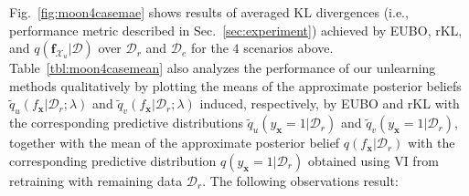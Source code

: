 \documentclass{article}
\theoremstyle{definition}
\newcommand{\mbf}[1]{\mathbf{#1}}
\newcommand{\mcl}[1]{\mathcal{#1}}
\newcommand{\da}{\mcl{D}}
\newcommand{\dc}{\mcl{D}_r}
\newcommand{\dr}{\mcl{D}_e}
\newcommand{\eubo}{\tilde{q}_u}
\newcommand{\elbo}{\tilde{q}_v}
\begin{document}
Fig.~\ref{fig:moon4casemae} shows results of averaged KL divergences (i.e., performance metric described in Sec.~\ref{sec:experiment}) achieved by EUBO, rKL, and $q(\mbf{f}_{\mcl{X}_u}|\da)$ over $\dc$ and $\dr$ for the $4$ scenarios above. 
Table~\ref{tbl:moon4casemean} also analyzes the performance of our unlearning methods qualitatively by plotting the means of the approximate posterior beliefs $\eubo(f_{\mbf{x}}|\dc; \lambda)$ and  $\elbo(f_{\mbf{x}}|\dc; \lambda)$ induced, respectively, by EUBO and rKL with the corresponding predictive distributions
$\eubo(y_{\mbf{x}}=1|\dc)$ and $\elbo(y_{\mbf{x}}=1|\dc)$, together with the mean of the approximate posterior belief $q(f_{\mbf{x}}|\dc)$ with the corresponding predictive distribution
$q(y_{\mbf{x}}=1|\dc)$ obtained using VI from retraining with remaining data $\dc$.
The following observations result:
%
\end{document}
